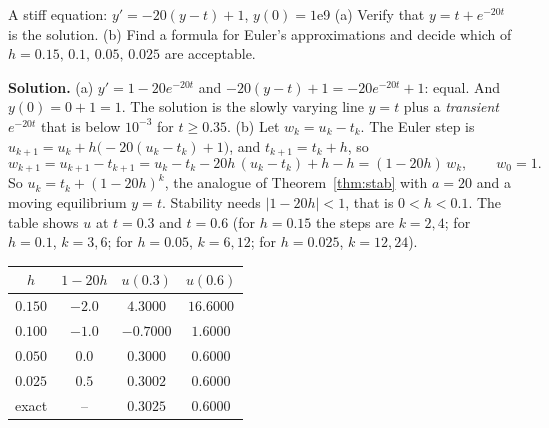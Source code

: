 \documentclass[11pt]{article}
\begin{document}
\begin{exmp}{A stiff equation: $y'=-20(y-t)+1$, $y(0)=1$}{e9}
(a) Verify that $y=t+e^{-20t}$ is the solution. (b) Find a formula for Euler's approximations and decide which of $h=0.15,\,0.1,\,0.05,\,0.025$ are acceptable.

\textbf{Solution.} (a) $y'=1-20e^{-20t}$ and $-20(y-t)+1=-20e^{-20t}+1$: equal. And $y(0)=0+1=1$. The solution is the slowly varying line $y=t$ plus a \emph{transient} $e^{-20t}$ that is below $10^{-3}$ for $t\ge0.35$.
(b) Let $w_k=u_k-t_k$. The Euler step is $u_{k+1}=u_k+h\big(-20(u_k-t_k)+1\big)$, and $t_{k+1}=t_k+h$, so
\[
w_{k+1}=u_{k+1}-t_{k+1}=u_k-t_k-20h\,(u_k-t_k)+h-h=(1-20h)\,w_k,\qquad w_0=1.
\]
So $u_k=t_k+(1-20h)^k$, the analogue of Theorem~\ref{thm:stab} with $a=20$ and a moving equilibrium $y=t$. Stability needs $\lvert1-20h\rvert<1$, that is $0<h<0.1$. The table shows $u$ at $t=0.3$ and $t=0.6$ (for $h=0.15$ the steps are $k=2,4$; for $h=0.1$, $k=3,6$; for $h=0.05$, $k=6,12$; for $h=0.025$, $k=12,24$).
\begin{center}
\begin{tabular}{cccc}
\toprule $h$ & $1-20h$ & $u(0.3)$ & $u(0.6)$ \\\midrule
$0.150$ & $-2.0$ & $4.3000$ & $16.6000$\\
$0.100$ & $-1.0$ & $-0.7000$ & $1.6000$\\
$0.050$ & $0.0$ & $0.3000$ & $0.6000$\\
$0.025$ & $0.5$ & $0.3002$ & $0.6000$\\
exact & -- & $0.3025$ & $0.6000$\\

\end{tabular}
\end{center}
\end{exmp}
\end{document}
